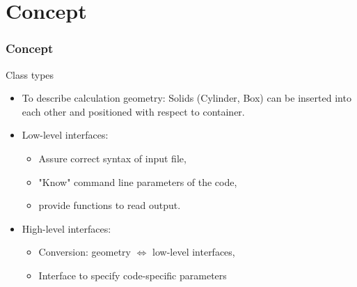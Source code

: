 \documentclass[t]{beamer}
\begin{document}
\section{Concept}
\begin{frame}\frametitle{Concept}
    \begin{block}{Class types}
        \begin{itemize}
            \item To describe calculation geometry:
                  Solids (Cylinder, Box) can be inserted into each other and
                  positioned with respect to container.

            \item Low-level interfaces:
                \begin{itemize}
                    \item Assure correct syntax of input file, 
                    \item "Know" command line parameters of the code, 
                    \item provide functions to read output. 
                \end{itemize}

            \item High-level interfaces:
                \begin{itemize}
                    \item Conversion: geometry $\Longleftrightarrow$ low-level interfaces,
                    \item Interface to specify code-specific parameters
                \end{itemize}
        \end{itemize}
    \end{block}

\end{frame}
\end{document}
